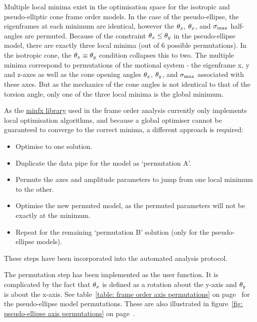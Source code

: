 Multiple local minima exist in the optimisation space for the isotropic and pseudo-elliptic cone frame order models.
In the case of the pseudo-ellipse, the eigenframes at each minimum are identical, however the $\theta_x$, $\theta_x$, and $\sigma_\textrm{max}$ half-angles are permuted.
Because of the constraint $\theta_x \le \theta_y$ in the pseudo-ellipse model, there are exactly three local minima (out of 6 possible permutations).
In the isotropic cone, the $\theta_x \equiv \theta_y$ condition collapses this to two.
The multiple minima correspond to permutations of the motional system - the eigenframe x, y and z-axes as well as the cone opening angles $\theta_x$, $\theta_y$, and $\sigma_\textrm{max}$ associated with these axes.
But as the mechanics of the cone angles is not identical to that of the torsion angle, only one of the three local minima is the global minimum.

As the \href{https://gna.org/projects/minfx/}{minfx library} used in the frame order analysis currently only implements local optimisation algorithms, and because a global optimiser cannot be guaranteed to converge to the correct minima, a different approach is required:
\begin{itemize}
    \item Optimise to one solution.
    \item Duplicate the data pipe for the model as `permutation A'.
    \item Permute the axes and amplitude parameters to jump from one local minimum to the other.
    \item Optimise the new permuted model,  as the permuted parameters will not be exactly at the minimum.
    \item Repeat for the remaining `permutation B' solution (only for the pseudo-ellipse models).
\end{itemize}

These steps have been incorporated into the automated analysis protocol.

The permutation step has been implemented as the  user function.
It is complicated by the fact that $\theta_x$ is defined as a rotation about the y-axis and $\theta_y$ is about the x-axis.
See table~\ref{table: frame order axis permutations} on page~\pageref{table: frame order axis permutations} for the pseudo-ellipse model permutations.
These are also illustrated in figure~\ref{fig: pseudo-ellipse axis permutations} on page~\pageref{fig: pseudo-ellipse axis permutations}.


